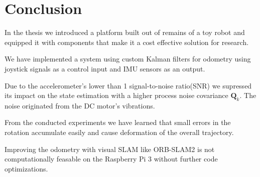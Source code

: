 \documentclass[class=report, crop=false]{standalone}
\begin{document}
\chapter{Conclusion}\label{cha:conclusion}

In the thesis we introduced a platform built out of remains of a toy robot and equipped it with components that make it a cost effective solution for research.

We have implemented a system using custom Kalman filters for odometry using joystick signals as a control input and IMU sensors as an output.

Due to the accelerometer's lower than 1 signal-to-noise ratio(SNR) we supressed its impact on the state estimation with a higher process noise covariance $\textbf{Q}_k$. The noise originated from the DC motor's vibrations.

From the conducted experiments we have learned that small errors in the rotation accumulate easily and cause deformation of the overall trajectory.

Improving the odometry with visual SLAM like ORB-SLAM2\cite{mur2017orb} is not computationally feasable on the Raspberry Pi 3 without further code optimizations.
\end{document}
